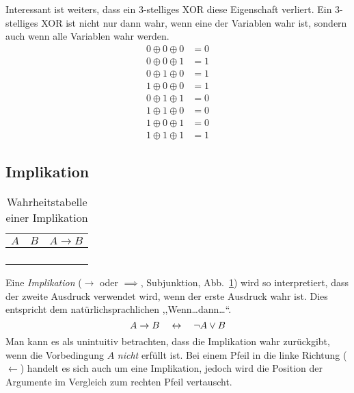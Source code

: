 Interessant ist weiters, dass ein 3-stelliges XOR diese Eigenschaft verliert. Ein 3-stelliges XOR ist nicht nur dann wahr, wenn eine der Variablen wahr ist, sondern auch wenn alle Variablen wahr werden.
%
\begin{align*}
  0 \oplus{} 0 \oplus{} 0 & = 0 \\
  0 \oplus{} 0 \oplus{} 1 & = 1 \\
  0 \oplus{} 1 \oplus{} 0 & = 1 \\
  1 \oplus{} 0 \oplus{} 0 & = 1 \\
  0 \oplus{} 1 \oplus{} 1 & = 0 \\
  1 \oplus{} 1 \oplus{} 0 & = 0 \\
  1 \oplus{} 0 \oplus{} 1 & = 0 \\
  1 \oplus{} 1 \oplus{} 1 & = 1
\end{align*}
%
\subsection{Implikation}
%
\begin{table}[ht]
 \begin{center}
  \begin{tabular}{cc|c}
   \hline
    $A$ & $B$ & $A \rightarrow{} B$ \\
   \hline \hline
    \F  & \F  & \T \\
    \F  & \T  & \T \\
    \T  & \F  & \F \\
    \T  & \T  & \T \\
  \end{tabular}
  \caption{Wahrheitstabelle einer Implikation}
  \label{fig:implication_operator}
 \end{center}
\end{table}
%
Eine \emph{Implikation} ($\rightarrow$ oder $\implies$, Subjunktion, Abb.~\ref{fig:implication_operator}) wird so interpretiert, dass der zweite Ausdruck verwendet wird, wenn der erste Ausdruck wahr ist. Dies entspricht dem natürlichsprachlichen ,,Wenn\dots dann\dots``.
\begin{equation}
  A \rightarrow B \quad\leftrightarrow\quad \neg A \lor B
\end{equation}
%
Man kann es als unintuitiv betrachten, dass die Implikation wahr zurückgibt, wenn die Vorbedingung $A$ \emph{nicht} erfüllt ist. Bei einem Pfeil in die linke Richtung ($\leftarrow$) handelt es sich auch um eine Implikation, jedoch wird die Position der Argumente im Vergleich zum rechten Pfeil vertauscht.

